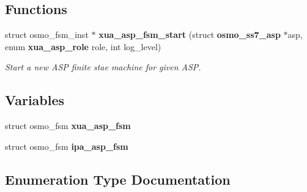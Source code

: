 \subsection*{Functions}
\begin{DoxyCompactItemize}
\item 
struct osmo\+\_\+fsm\+\_\+inst $\ast$ {\bf xua\+\_\+asp\+\_\+fsm\+\_\+start} (struct {\bf osmo\+\_\+ss7\+\_\+asp} $\ast$asp, enum {\bf xua\+\_\+asp\+\_\+role} role, int log\+\_\+level)
\begin{DoxyCompactList}\small\item\em Start a new A\+SP finite stae machine for given A\+SP. \end{DoxyCompactList}\end{DoxyCompactItemize}
\subsection*{Variables}
\begin{DoxyCompactItemize}
\item 
struct osmo\+\_\+fsm {\bf xua\+\_\+asp\+\_\+fsm}
\item 
struct osmo\+\_\+fsm {\bf ipa\+\_\+asp\+\_\+fsm}
\end{DoxyCompactItemize}


\subsection{Enumeration Type Documentation}
